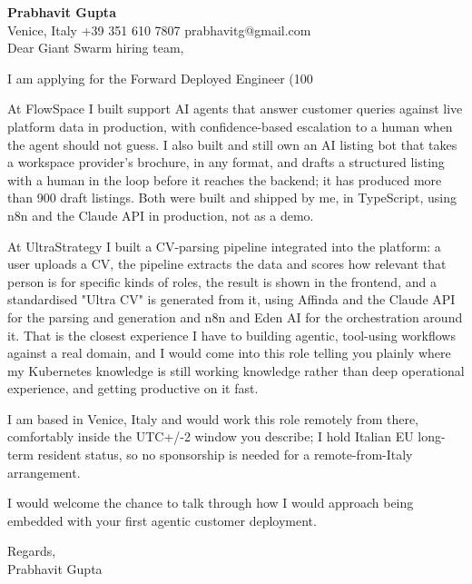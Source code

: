 \documentclass[a4paper,10.5pt]{article}
\begin{document}
\textbf{Prabhavit Gupta}\\
Venice, Italy \textbar{} +39 351 610 7807 \textbar{} prabhavitg@gmail.com\\[10pt]
Dear Giant Swarm hiring team,

I am applying for the Forward Deployed Engineer (100%

At FlowSpace I built support AI agents that answer customer queries against live platform data in production, with confidence-based escalation to a human when the agent should not guess. I also built and still own an AI listing bot that takes a workspace provider's brochure, in any format, and drafts a structured listing with a human in the loop before it reaches the backend; it has produced more than 900 draft listings. Both were built and shipped by me, in TypeScript, using n8n and the Claude API in production, not as a demo.

At UltraStrategy I built a CV-parsing pipeline integrated into the platform: a user uploads a CV, the pipeline extracts the data and scores how relevant that person is for specific kinds of roles, the result is shown in the frontend, and a standardised "Ultra CV" is generated from it, using Affinda and the Claude API for the parsing and generation and n8n and Eden AI for the orchestration around it. That is the closest experience I have to building agentic, tool-using workflows against a real domain, and I would come into this role telling you plainly where my Kubernetes knowledge is still working knowledge rather than deep operational experience, and getting productive on it fast.

I am based in Venice, Italy and would work this role remotely from there, comfortably inside the UTC+/-2 window you describe; I hold Italian EU long-term resident status, so no sponsorship is needed for a remote-from-Italy arrangement.

I would welcome the chance to talk through how I would approach being embedded with your first agentic customer deployment.

Regards,\\
Prabhavit Gupta
\end{document}
